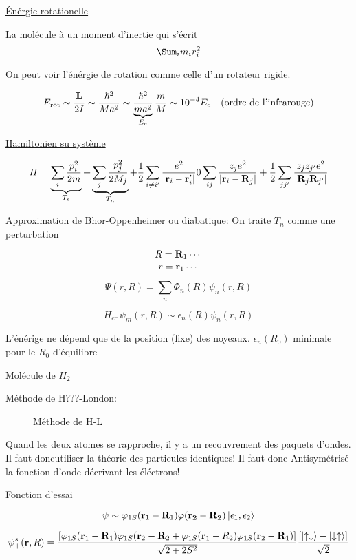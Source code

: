 \underline{Énérgie rotationelle} 

La molécule à un moment d'inertie qui s'écrit $$\Sum_{i} m_{i} r_{i}^2$$ 

On peut voir l'énérgie de rotation comme celle d'un rotateur rigide.

$$E_{\rm{rot}} \sim \frac{\vb{L}}{2I} \sim \frac{\hbar^2}{Ma^2} \sim \underbrace{\frac{\hbar^2}{ma^2}}_{E_e} \frac{m}{M} \sim 10^{-4} E_{e} \quad \text{(ordre de l'infrarouge)}$$ 


\underline{Hamiltonien su système} 

$$H = \underbrace{\sum_{i} \frac{p_{i}^2}{2m}}_{T_e} + \underbrace{\sum_{j} \frac{p_{j}^2}{2M_j}}_{T_{n}}  + \frac{1}{2} \sum_{i\neq i'} \frac{e^2}{|\vb{r}_i - \vb{r}_i'|}0 \sum_{ij} \frac{z_{j}e^2}{|\vb{r}_i-\vb{R}_j|} + \frac{1}{2} \sum_{jj'} \frac{z_{j} z_{j'} e^2}{|\vb{R}_j \vb{R}_{j'} |}  $$ 

Approximation de Bhor-Oppenheimer ou diabatique: On traite $T_{n}$ comme une perturbation

\begin{tcolorbox}[title=Parenthèse notation]
	$$R = \vb{R}_1 \dotsb$$
	$$r = \vb{r}_1 \dotsb$$ 
\end{tcolorbox}

$$\Psi(r,R) = \sum_{n} \Phi_n(R)\psi_n(r,R)$$ 

$$\boxed{H_{e^-} \psi_{m} (r,R) \sim \epsilon_{n} (R) \psi_n(r,R)}$$ 

L'énérige ne dépend que de la position (fixe) des noyeaux. $\epsilon_{n} (R_0)$ minimale pour le $R_{0}$ d'équilibre 

\underline{Molécule de $H_2$ } 

Méthode de H???-London:

\begin{figure}[ht]
    \centering
    \caption{Méthode de H-L}
    \label{fig:méthode-de-h-l}
\end{figure}

Quand les deux atomes se rapproche, il y a un recouvrement des paquets d'ondes. Il faut doncutiliser la théorie des particules identiques! Il faut donc Antisymétrisé la fonction d'onde décrivant les éléctrons!

\underline{Fonction d'essai}

$$\psi \sim \varphi_{1S} (\vb{r}_1 - \vb{R}_1) \varphi(\vb{r_2}-\vb{R_2}) \ket{\epsilon_{1}, \epsilon_{2} }$$ 


 $$\psi_{+}^s (\vb{r}, R) = \frac{\left[ \varphi_{1S} (\vb{r}_1-\vb{R}_1) \varphi_{1S} (\vb{r}_2 -\vb{R}_2 + \varphi_{1S}(\vb{r}_1 - R_{2} ) \varphi_{1S} (\vb{r}_2 - \vb{R}_1) \right] }{\sqrt{2+2S^2}} \frac{\left[ \ket{\uparrow\downarrow} - \ket{\downarrow \uparrow} \right] }{\sqrt{2}}$$ 

